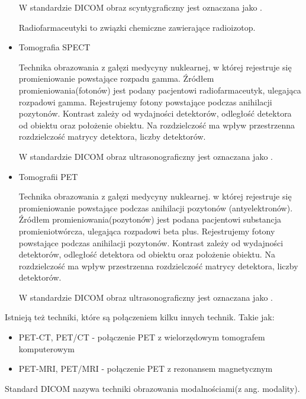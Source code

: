 \begin{itemize}
    W standardzie DICOM obraz scyntygraficzny jest oznaczana jako .

    Radiofarmaceutyki to związki chemiczne zawierające radioizotop.

    \item Tomografia SPECT
    
    Technika obrazowania  z gałęzi medycyny nuklearnej, w której rejestruje się promieniowanie powstające rozpadu gamma.
    Źródłem promieniowania(fotonów) jest podany pacjentowi radiofarmaceutyk, ulegająca rozpadowi gamma.
    Rejestrujemy fotony powstające podczas anihilacji pozytonów.
    Kontrast zależy od wydajności detektorów, odległość detektora od obiektu oraz położenie obiektu.
    Na rozdzielczość ma wpływ przestrzenna rozdzielczość matrycy detektora, liczby detektorów.

    W standardzie DICOM obraz ultrasonograficzny jest oznaczana jako .

    \item Tomografii PET
    
    Technika obrazowania  z gałęzi medycyny nuklearnej. w której rejestruje się promieniowanie powstające podczas anihilacji pozytonów (antyelektronów).
    Źródłem promieniowania(pozytonów) jest podana pacjentowi substancja promieniotwórcza, ulegająca rozpadowi beta plus.
    Rejestrujemy fotony powstające podczas anihilacji pozytonów.
    Kontrast zależy od wydajności detektorów, odległość detektora od obiektu oraz położenie obiektu.
    Na rozdzielczość ma wpływ przestrzenna rozdzielczość matrycy detektora, liczby detektorów.

    W standardzie DICOM obraz ultrasonograficzny jest oznaczana jako .
    
\end{itemize}

Istnieją też techniki, które są połączeniem kilku innych technik.
Takie jak:
\begin{itemize}
    \item PET-CT, PET/CT - połączenie PET z wielorzędowym tomografem komputerowym
    \item PET-MRI, PET/MRI - połączenie PET z rezonansem magnetycznym
\end{itemize}

Standard DICOM nazywa techniki obrazowania modalnościami(z ang. modality).